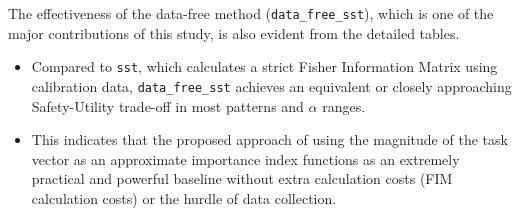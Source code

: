 \documentclass{article}
\begin{document}
The effectiveness of the data-free method (\texttt{data\_free\_sst}), which is one of the major contributions of this study, is also evident from the detailed tables.
\begin{itemize}
    \item Compared to \texttt{sst}, which calculates a strict Fisher Information Matrix using calibration data, \texttt{data\_free\_sst} achieves an equivalent or closely approaching Safety-Utility trade-off in most patterns and $\alpha$ ranges.
    \item This indicates that the proposed approach of using the magnitude of the task vector as an approximate importance index functions as an extremely practical and powerful baseline without extra calculation costs (FIM calculation costs) or the hurdle of data collection.
\end{itemize}

\newpage
\end{document}
